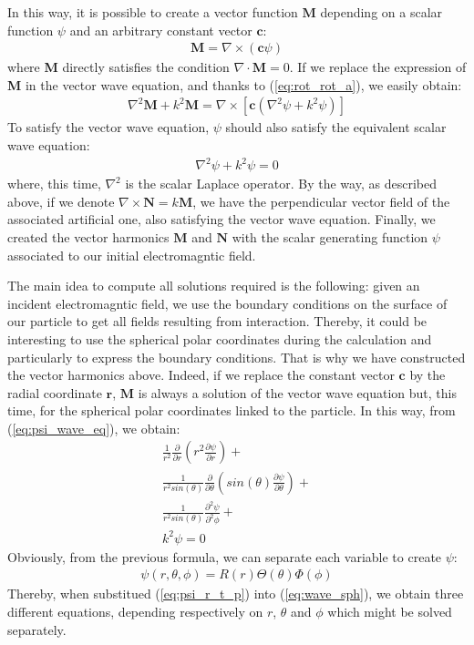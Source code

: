 \documentclass{article}
\begin{document}
In this way, it is possible to create a vector function $\textbf{M}$ depending on a scalar function $\psi$ and an arbitrary constant vector $\textbf{c}$:
\begin{align}
\textbf{M} = \nabla \times (\textbf{c}\psi)
\end{align}
where \textbf{M} directly satisfies the condition $\nabla \cdot \textbf{M} = 0$. If we replace the expression of \textbf{M} in the vector wave equation, and thanks to (\ref{eq:rot_rot_a}), we easily obtain:
\begin{align}
\nabla ^{2} \textbf{M} + k^{2}\textbf{M} = \nabla \times [\textbf{c}(\nabla ^{2} \psi + k^{2}\psi)]
\end{align}
To satisfy the vector wave equation, $\psi$ should also satisfy the equivalent scalar wave equation:
\begin{align}\label{eq:psi_wave_eq}
\nabla ^{2} \psi + k^{2}\psi = 0
\end{align}
where, this time, $\nabla ^{2}$ is the scalar Laplace operator. By the way, as described above, if we denote $\nabla \times \textbf{N} = k \textbf{M}$, we have the perpendicular vector field of the associated artificial one, also satisfying the vector wave equation. Finally, we created the vector harmonics $\textbf{M}$ and $\textbf{N}$ with the scalar generating function $\psi$ associated to our initial electromagntic field.

The main idea to compute all solutions required is the following: given an incident electromagntic field, we use the boundary conditions on the surface of our particle to get all fields resulting from interaction. Thereby, it could be interesting to use the spherical polar coordinates during the calculation and particularly to express the boundary conditions. That is why we have constructed the vector harmonics above. Indeed, if we replace the constant vector $\textbf{c}$ by the radial coordinate $\textbf{r}$, $\textbf{M}$ is always a solution of the vector wave equation but, this time, for the spherical polar coordinates linked to the particle. In this way, from (\ref{eq:psi_wave_eq}), we obtain:
\begin{equation}\label{eq:wave_sph}
\begin{aligned}
\frac{1}{r^{2}}\frac{\partial }{\partial r}(r^{2}\frac{\partial \psi}{\partial r}) + \\ 
\frac{1}{r^{2}sin(\theta)}\frac{\partial }{\partial \theta}(sin(\theta)\frac{\partial \psi}{\partial \theta}) + \\
\frac{1}{r^{2}sin(\theta)}\frac{\partial^{2} \psi}{\partial^{2} \phi} + \\
k^{2}\psi = 0
\end{aligned}
\end{equation}
Obviously, from the previous formula, we can separate each variable to create $\psi$:
\begin{align}\label{eq:psi_r_t_p}
\psi(r, \theta, \phi) = R(r)\Theta(\theta)\Phi(\phi)
\end{align}
Thereby, when substitued (\ref{eq:psi_r_t_p}) into (\ref{eq:wave_sph}), we obtain three different equations, depending respectively on $r$, $\theta$ and $\phi$ which might be solved separately.
\end{document}
